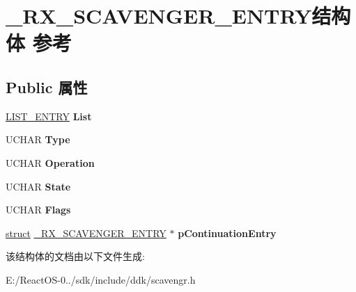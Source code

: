 \hypertarget{struct___r_x___s_c_a_v_e_n_g_e_r___e_n_t_r_y}{}\section{\+\_\+\+R\+X\+\_\+\+S\+C\+A\+V\+E\+N\+G\+E\+R\+\_\+\+E\+N\+T\+R\+Y结构体 参考}
\label{struct___r_x___s_c_a_v_e_n_g_e_r___e_n_t_r_y}
\subsection*{Public 属性}
\begin{DoxyCompactItemize}
\item 
\mbox{\label{struct___r_x___s_c_a_v_e_n_g_e_r___e_n_t_r_y_a4cc42caee88b4ec6a9d25fc7b16fcec1}} 
\hyperlink{struct___l_i_s_t___e_n_t_r_y}{L\+I\+S\+T\+\_\+\+E\+N\+T\+RY} {\bfseries List}
\item 
\mbox{\label{struct___r_x___s_c_a_v_e_n_g_e_r___e_n_t_r_y_aeb3dc7a7cb58534cc9154a8e40281963}} 
U\+C\+H\+AR {\bfseries Type}
\item 
\mbox{\label{struct___r_x___s_c_a_v_e_n_g_e_r___e_n_t_r_y_af7dac7cd9937fede39492e62451b77b5}} 
U\+C\+H\+AR {\bfseries Operation}
\item 
\mbox{\label{struct___r_x___s_c_a_v_e_n_g_e_r___e_n_t_r_y_aa84674e84af06613a72d3c2afebb7779}} 
U\+C\+H\+AR {\bfseries State}
\item 
\mbox{\label{struct___r_x___s_c_a_v_e_n_g_e_r___e_n_t_r_y_a36f45275ea636f0df243ab06b79db202}} 
U\+C\+H\+AR {\bfseries Flags}
\item 
\mbox{\label{struct___r_x___s_c_a_v_e_n_g_e_r___e_n_t_r_y_aeff272faa3da531e5d2d249f5a298cf5}} 
\hyperlink{interfacestruct}{struct} \hyperlink{struct___r_x___s_c_a_v_e_n_g_e_r___e_n_t_r_y}{\+\_\+\+R\+X\+\_\+\+S\+C\+A\+V\+E\+N\+G\+E\+R\+\_\+\+E\+N\+T\+RY} $\ast$ {\bfseries p\+Continuation\+Entry}
\end{DoxyCompactItemize}


该结构体的文档由以下文件生成\+:\begin{DoxyCompactItemize}
\item 
E\+:/\+React\+O\+S-\/0../sdk/include/ddk/scavengr.\+h\end{DoxyCompactItemize}
